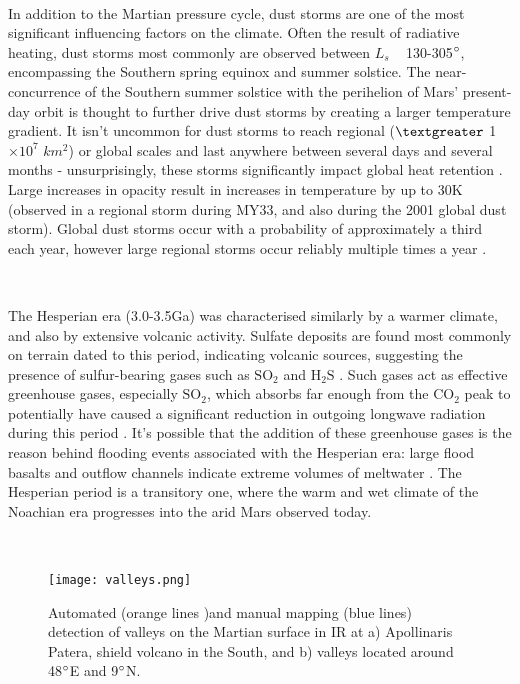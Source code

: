 \documentclass[12pt,onecolumn]{revtex4-2}    %
\begin{document}
\

In addition to the Martian pressure cycle, dust storms are one of the most significant influencing factors on the climate. Often the result of radiative heating, dust storms most commonly are observed between $L_{s}$ ~ 130-305$\degree$, encompassing the Southern spring equinox and summer solstice. The near-concurrence of the Southern summer solstice with the perihelion of Mars' present-day orbit is thought to further drive dust storms by creating a larger temperature gradient. It isn't uncommon for dust storms to reach regional ($\textgreater$ 1$\times 10^{7}$ $km^{2}$) or global scales and last anywhere between several days and several months - unsurprisingly, these storms significantly impact global heat retention \cite{WR13}. Large increases in opacity result in increases in temperature by up to 30K (observed in a regional storm during MY33, and also during the 2001 global dust storm). Global dust storms occur with a probability of approximately a third each year, however large regional storms occur reliably multiple times a year \cite{W20}.

\

The Hesperian era (3.0-3.5Ga) was characterised similarly by a warmer climate, and also by extensive volcanic activity. Sulfate deposits are found most commonly on terrain dated to this period, indicating volcanic sources, suggesting the presence of sulfur-bearing gases such as $\mathrm{SO_2}$ and $\mathrm{H_2 S}$ \cite{HKP02}. Such gases act as effective greenhouse gases, especially $\mathrm{SO_2}$, which absorbs far enough from the $\mathrm{CO_2}$ peak to potentially have caused a significant reduction in outgoing longwave radiation during this period \cite{HZS07}. It's possible that the addition of these greenhouse gases is the reason behind flooding events associated with the Hesperian era: large flood basalts and outflow channels indicate extreme volumes of meltwater \cite{HH14}. The Hesperian period is a transitory one, where the warm and wet climate of the Noachian era progresses into the arid Mars observed today.

\

\begin{figure}[b]
\centering
\texttt{[image: valleys.png]}
\caption{Automated (orange lines )and manual mapping (blue lines) detection of valleys on the Martian surface in IR at a) Apollinaris Patera, shield volcano in the South, and b) valleys located around 48$\degree$E and 9$\degree$N. \cite{HBH10}}
\label{fig:valleys}
\end{figure}
\end{document}

